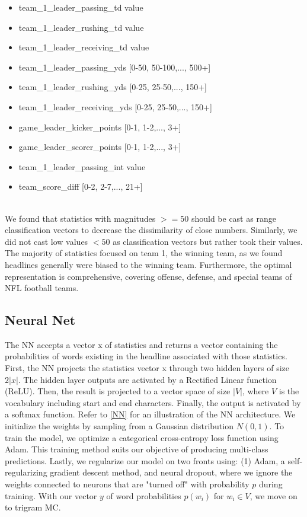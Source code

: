 \documentclass[12pt, journal]{IEEEtran}
\begin{document}
\begin{itemize}
  \item team\_1\_leader\_passing\_td  value
  \item team\_1\_leader\_rushing\_td value
  \item team\_1\_leader\_receiving\_td value
  \item team\_1\_leader\_passing\_yds [0-50, 50-100,..., 500+]
  \item team\_1\_leader\_rushing\_yds [0-25, 25-50,..., 150+]
  \item team\_1\_leader\_receiving\_yds [0-25, 25-50,..., 150+]
  \item game\_leader\_kicker\_points [0-1, 1-2,..., 3+]
  \item game\_leader\_scorer\_points [0-1, 1-2,..., 3+]
  \item team\_1\_leader\_passing\_int value
  \item team\_score\_diff [0-2, 2-7,..., 21+]
\end{itemize} \\

We found that statistics with magnitudes $>= 50$ should be cast as range classification vectors to decrease the dissimilarity of close numbers. Similarly, we did not cast low values $< 50$ as classification vectors but rather took their values. The majority of statistics focused on team 1, the winning team, as we found headlines generally were biased to the winning team. Furthermore, the optimal representation is comprehensive, covering offense, defense, and special teams of NFL football teams. 

\subsection{Neural Net} 
The NN accepts a vector x of statistics and returns a vector containing the probabilities of words existing in the headline associated with those statistics. First, the NN projects the statistics vector x through two hidden layers of size $2|x|$. The hidden layer outputs are activated by a Rectified Linear function (ReLU). Then, the result is projected to a vector space of size $|V|$, where $V$ is the vocabulary including start and end characters. Finally, the output is activated by a softmax function. Refer to \ref{NN} for an illustration of the NN architecture. We initialize the weights by sampling from a Gaussian distribution $N(0,1)$. To train the model, we optimize a categorical cross-entropy loss function using Adam. This training method suits our objective of producing multi-class predictions. Lastly, we regularize our model on two fronts using: (1) Adam, a self-regularizing gradient descent method, and neural dropout, where we ignore the weights connected to neurons that are "turned off" with probability $p$ during training. With our vector $y$ of word probabilities $p(w_i)$ for $w_i \in V$, we move on to trigram MC.
\end{document}
